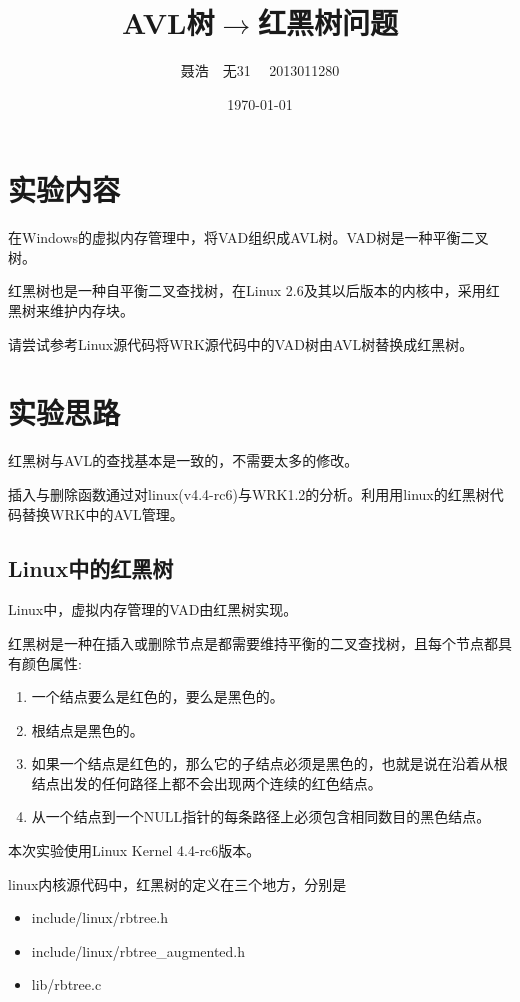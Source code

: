 
\title{AVL树$\rightarrow$红黑树问题}
\author{聂浩~~无31~~ 2013011280}
\date{\today}

\maketitle
\section{实验内容}
在Windows的虚拟内存管理中，将VAD组织成AVL树。VAD树是一种平衡二叉树。

红黑树也是一种自平衡二叉查找树，在Linux 2.6及其以后版本的内核中，采用红黑树来维护内存块。

请尝试参考Linux源代码将WRK源代码中的VAD树由AVL树替换成红黑树。

\section{实验思路}
红黑树与AVL的查找基本是一致的，不需要太多的修改。

插入与删除函数通过对linux(v4.4-rc6)与WRK1.2的分析。利用用linux的红黑树代码替换WRK中的AVL管理。
\subsection{Linux中的红黑树}
Linux中，虚拟内存管理的VAD由红黑树实现。

红黑树是一种在插入或删除节点是都需要维持平衡的二叉查找树，且每个节点都具有颜色属性:
\begin{enumerate}
    \item{一个结点要么是红色的，要么是黑色的。}
    \item{根结点是黑色的。}
    \item{如果一个结点是红色的，那么它的子结点必须是黑色的，也就是说在沿着从根结点出发的任何路径上都不会出现两个连续的红色结点。}
    \item{从一个结点到一个NULL指针的每条路径上必须包含相同数目的黑色结点。}
\end{enumerate}

本次实验使用Linux Kernel 4.4-rc6版本。

linux内核源代码中，红黑树的定义在三个地方，分别是
\begin{itemize}
    \item{include/linux/rbtree.h}
    \item{include/linux/rbtree\_augmented.h}
    \item{lib/rbtree.c}
\end{itemize}

